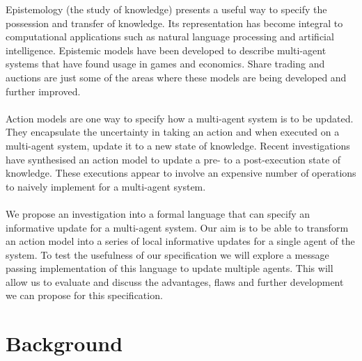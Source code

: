 \documentclass[12pt, a4paper]{article}
\begin{document}
Epistemology (the study of knowledge) presents a useful way to specify the possession and transfer of knowledge.
Its representation has become integral to computational applications such as natural language processing and artificial intelligence.
Epistemic models have been developed to describe multi-agent systems that have found usage in games and economics.
Share trading and auctions are just some of the areas where these models are being developed and further improved.\\
\\
Action models are one way to specify how a multi-agent system is to be updated.
They encapsulate the uncertainty in taking an action and when executed on a multi-agent system, update it to a new state of knowledge.
Recent investigations have synthesised an action model to update a pre- to a post-execution state of knowledge.
These executions appear to involve an expensive number of operations to naively implement for a multi-agent system.\\
\\
We propose an investigation into a formal language that can specify an informative update for a multi-agent system.
Our aim is to be able to transform an action model into a series of local informative updates for a single agent of the system.
To test the usefulness of our specification we will explore a message passing implementation of this language to update multiple agents.
This will allow us to evaluate and discuss the advantages, flaws and further development we can propose for this specification.
%

\section*{Background}
\end{document}
